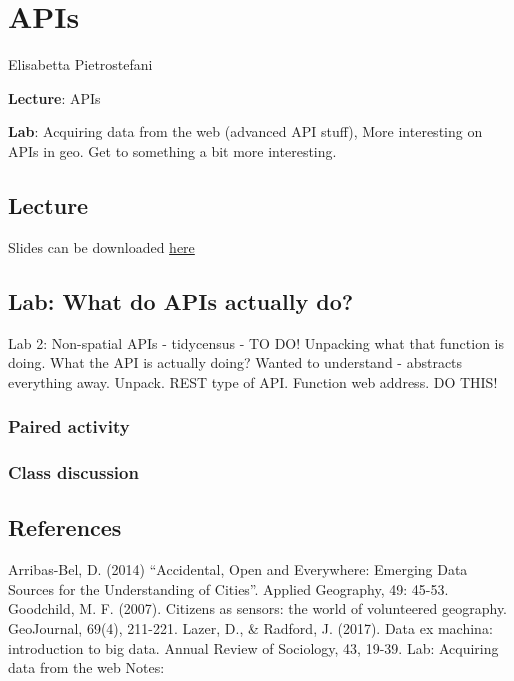 \documentclass[
  letterpaper,
  DIV=11,
  numbers=noendperiod]{scrreprt}
\begin{document}

\hypertarget{apis}{%
\chapter{APIs}\label{apis}}

Elisabetta Pietrostefani

\textbf{Lecture}: APIs

\textbf{Lab}: Acquiring data from the web (advanced API stuff), More
interesting on APIs in geo. Get to something a bit more interesting.

\hypertarget{lecture-3}{%
\section{Lecture}\label{lecture-3}}

Slides can be downloaded
\href{https://github.com/GDSL-UL/wma/raw/main/pdf/lecture_04.pdf}{here}

\hypertarget{lab-what-do-apis-actually-do-1}{%
\section{Lab: What do APIs actually
do?}\label{lab-what-do-apis-actually-do-1}}

Lab 2: Non-spatial APIs - tidycensus - TO DO! Unpacking what that
function is doing. What the API is actually doing? Wanted to understand
- abstracts everything away. Unpack. REST type of API. Function web
address. DO THIS!

\hypertarget{paired-activity-2}{%
\subsection{Paired activity}\label{paired-activity-2}}

\hypertarget{class-discussion-2}{%
\subsection{Class discussion}\label{class-discussion-2}}

\hypertarget{references-3}{%
\section{References}\label{references-3}}

Arribas-Bel, D. (2014) ``Accidental, Open and Everywhere: Emerging Data
Sources for the Understanding of Cities''. Applied Geography, 49: 45-53.
Goodchild, M. F. (2007). Citizens as sensors: the world of volunteered
geography. GeoJournal, 69(4), 211-221. Lazer, D., \& Radford, J. (2017).
Data ex machina: introduction to big data. Annual Review of Sociology,
43, 19-39. Lab: Acquiring data from the web Notes:
\end{document}
